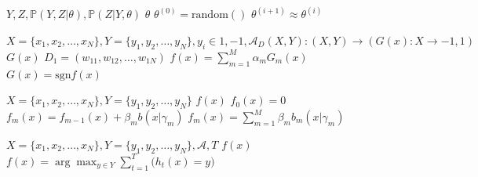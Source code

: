 \documentclass[twocolumn]{ctexart}
\begin{document}
\begin{algorithm}
  \caption{}%
  \label{al:em}
  \begin{algorithmic}
    \REQUIRE$Y, Z, \mathbb{P}(Y, Z|\theta), \mathbb{P}(Z|Y, \theta)$
    \ENSURE$\theta$
    \STATE$\theta^{(0)} = \mathrm{random}()$
    \UNTIL$\theta^{(i + 1)} \approx \theta^{(i)}$
  \end{algorithmic}
\end{algorithm}
\begin{algorithm}
  \caption{}%
  \label{al:adaboost}
  \begin{algorithmic}
    \REQUIRE$X = \{x_1, x_2, \ldots, x_N\}, Y = \{y_1, y_2, \ldots, y_N\}, y_i
    \in {1, -1}, \mathscr{A}_D(X, Y): (X, Y) \rightarrow
    (G(x): X \rightarrow {-1, 1})$
    \ENSURE$G(x)$
    \ENDFOR%
    \STATE$D_1 = (w_{11}, w_{12}, \ldots, w_{1N})$
    \ENDFOR%
    \STATE$f(x) = \sum_{m = 1}^M \alpha_m G_m(x)$
    \STATE$G(x) = \mathrm{sgn}f(x)$
  \end{algorithmic}
\end{algorithm}
\begin{algorithm}
  \caption{}%
  \label{al:forward}
  \begin{algorithmic}
    \REQUIRE$X = \{x_1, x_2, \ldots, x_N\}, Y = \{y_1, y_2, \ldots, y_N\}$
    \ENSURE$f(x)$
    \STATE$f_0(x) = 0$
    \ENDFOR%
    \STATE$f_m(x) = f_{m - 1}(x) + \beta_m b(x|\gamma_m)$
    \STATE$f_m(x) = \sum_{m = 1}^M \beta_m b_m(x|\gamma_m)$
  \end{algorithmic}
\end{algorithm}
\begin{algorithm}
  \caption{}%
  \label{al:baggin}
  \begin{algorithmic}
    \REQUIRE$X = \{x_1, x_2, \ldots, x_N\}, Y = \{y_1, y_2, \ldots, y_N\},
    \mathscr{A}, T$
    \ENSURE$f(x)$
    \ENDFOR%
    \STATE$f(x) = \arg\max_{y \in Y}\sum_{t = 1}^T \mathbb(h_t(x) = y)$
  \end{algorithmic}
\end{algorithm}
\end{document}
